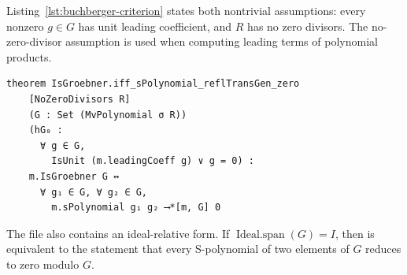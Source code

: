 Listing~\ref{lst:buchberger-criterion} states both nontrivial assumptions:
every nonzero $g\in G$ has unit leading coefficient, and $R$ has no zero
divisors.  The no-zero-divisor assumption is used when computing leading terms
of polynomial products.

\begin{lstlisting}[style=lean,caption={Buchberger's criterion for the self-relative Gr\"obner predicate.},label={lst:buchberger-criterion}]
theorem IsGroebner.iff_sPolynomial_reflTransGen_zero
    [NoZeroDivisors R]
    (G : Set (MvPolynomial σ R))
    (hG₀ :
      ∀ g ∈ G,
        IsUnit (m.leadingCoeff g) ∨ g = 0) :
    m.IsGroebner G ↔
      ∀ g₁ ∈ G, ∀ g₂ ∈ G,
        m.sPolynomial g₁ g₂ ⟶*[m, G] 0
\end{lstlisting}

The file also contains an ideal-relative form.  If
$\operatorname{Ideal.span}(G)=I$, then
 is equivalent to the statement that every
S-polynomial of two elements of $G$ reduces to zero modulo $G$.
